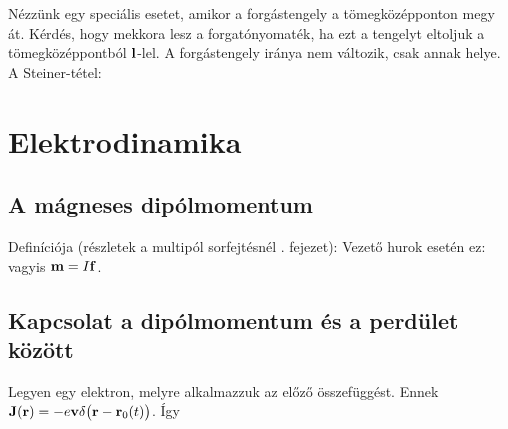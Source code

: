    Nézzünk egy speciális esetet, amikor a forgástengely a tömegközépponton megy át. Kérdés, hogy mekkora lesz a forgatónyomaték, ha ezt a tengelyt eltoljuk a tömegközéppontból $\mathbf{l}$-lel. A forgástengely iránya nem változik, csak annak helye. A Steiner-tétel:
   
 \section{Elektrodinamika}
  
  \subsection{A mágneses dipólmomentum}
  
  Definíciója (részletek a multipól sorfejtésnél . fejezet): 
  Vezető hurok esetén ez:
  vagyis $\mathbf{m}=I\mathbf{f}$. 
  
 \subsection{Kapcsolat a dipólmomentum és a perdület között}
  
  Legyen egy elektron, melyre alkalmazzuk az előző összefüggést. Ennek $\mathbf{J}(\mathbf{r})=-e\mathbf{v}\delta\big(\mathbf{r}-\mathbf{r}_0(t)\big)$. Így
  

